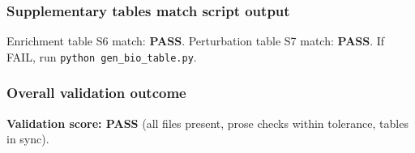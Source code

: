 \subsubsection{Supplementary tables match script output}
Enrichment table S6 match: \textbf{PASS}. Perturbation table S7 match: \textbf{PASS}. If FAIL, run \texttt{python gen\_bio\_table.py}.
\subsubsection{Overall validation outcome}
\textbf{Validation score: PASS} (all files present, prose checks within tolerance, tables in sync).